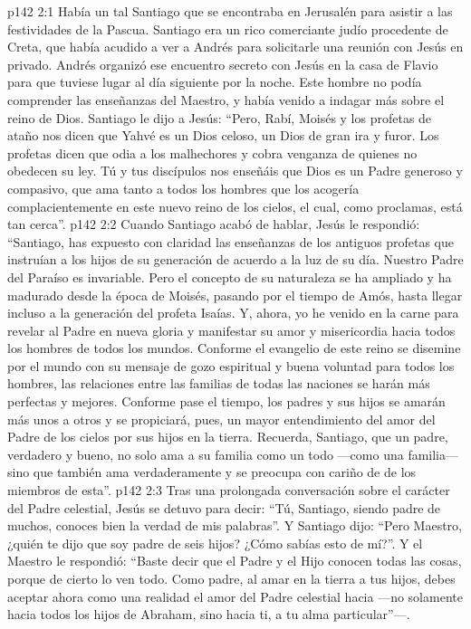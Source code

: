 \vs p142 2:1 Había un tal Santiago que se encontraba en Jerusalén para asistir a las festividades de la Pascua. Santiago era un rico comerciante judío procedente de Creta, que había acudido a ver a Andrés para solicitarle una reunión con Jesús en privado. Andrés organizó ese encuentro secreto con Jesús en la casa de Flavio para que tuviese lugar al día siguiente por la noche. Este hombre no podía comprender las enseñanzas del Maestro, y había venido a indagar más sobre el reino de Dios. Santiago le dijo a Jesús: “Pero, Rabí, Moisés y los profetas de ataño nos dicen que Yahvé es un Dios celoso, un Dios de gran ira y furor. Los profetas dicen que odia a los malhechores y cobra venganza de quienes no obedecen su ley. Tú y tus discípulos nos enseñáis que Dios es un Padre generoso y compasivo, que ama tanto a todos los hombres que los acogería complacientemente en este nuevo reino de los cielos, el cual, como proclamas, está tan cerca”.
\vs p142 2:2 \pc Cuando Santiago acabó de hablar, Jesús le respondió: “Santiago, has expuesto con claridad las enseñanzas de los antiguos profetas que instruían a los hijos de su generación de acuerdo a la luz de su día. Nuestro Padre del Paraíso es invariable. Pero el concepto de su naturaleza se ha ampliado y ha madurado desde la época de Moisés, pasando por el tiempo de Amós, hasta llegar incluso a la generación del profeta Isaías. Y, ahora, yo he venido en la carne para revelar al Padre en nueva gloria y manifestar su amor y misericordia hacia todos los hombres de todos los mundos. Conforme el evangelio de este reino se disemine por el mundo con su mensaje de gozo espiritual y buena voluntad para todos los hombres, las relaciones entre las familias de todas las naciones se harán más perfectas y mejores. Conforme pase el tiempo, los padres y sus hijos se amarán más unos a otros y se propiciará, pues, un mayor entendimiento del amor del Padre de los cielos por sus hijos en la tierra. Recuerda, Santiago, que un padre, verdadero y bueno, no solo ama a su familia como un todo ---como una familia--- sino que también ama verdaderamente y se preocupa con cariño de  de los miembros de esta”.
\vs p142 2:3 Tras una prolongada conversación sobre el carácter del Padre celestial, Jesús se detuvo para decir: “Tú, Santiago, siendo padre de muchos, conoces bien la verdad de mis palabras”. Y Santiago dijo: “Pero Maestro, ¿quién te dijo que soy padre de seis hijos? ¿Cómo sabías esto de mí?”. Y el Maestro le respondió: “Baste decir que el Padre y el Hijo conocen todas las cosas, porque de cierto lo ven todo. Como padre, al amar en la tierra a tus hijos, debes aceptar ahora como una realidad el amor del Padre celestial hacia  ---no solamente hacia todos los hijos de Abraham, sino hacia ti, a tu alma particular”---.
